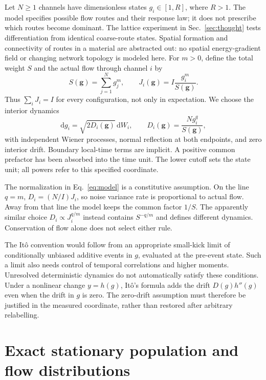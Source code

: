 \documentclass[11pt,a4paper]{article}
\newcommand{\dd}{\mathrm{d}}
\begin{document}
Let $N\geq1$ channels have dimensionless states $g_i\in[1,R]$, where $R>1$.
The model specifies possible flow routes and their response law; it does not
prescribe which routes become dominant. The lattice experiment in
Sec.~\ref{sec:thought} tests differentiation from identical coarse-route states.
Spatial formation and connectivity of routes in a material are abstracted out:
no spatial energy-gradient field or changing network topology is modeled here.
For $m>0$, define the total weight $S$ and the actual flow through channel $i$ by
\begin{equation}
 S(\mathbf g)=\sum_{j=1}^N g_j^m,\qquad
 J_i(\mathbf g)=I\frac{g_i^m}{S(\mathbf g)}.
 \label{eq:share}
\end{equation}
Thus $\sum_i J_i=I$ for every configuration, not only in expectation. We choose
the interior dynamics
\begin{equation}
 \dd g_i=\sqrt{2D_i(\mathbf g)}\,\dd W_i,\qquad
 D_i(\mathbf g)=\frac{N g_i^q}{S(\mathbf g)},
 \label{eq:model}
\end{equation}
with independent Wiener processes, normal reflection at both endpoints, and
zero interior drift. Boundary local-time terms are implicit. A positive common
prefactor has been absorbed into the time unit. The lower cutoff sets the state
unit; all powers refer to this specified coordinate.

The normalization in Eq.~\eqref{eq:model} is a constitutive assumption. On the
line $q=m$, $D_i=(N/I)J_i$, so noise variance rate is proportional to actual
flow. Away from that line the model keeps the common factor $1/S$. The apparently
similar choice $D_i\propto J_i^{q/m}$ instead contains $S^{-q/m}$ and defines
different dynamics. Conservation of flow alone does not select either rule.

The It\^o convention would follow from an appropriate small-kick limit of
conditionally unbiased additive events in $g$, evaluated at the pre-event
state. Such a limit also needs control of temporal correlations and higher
moments. Unresolved deterministic dynamics do not automatically satisfy these
conditions. Under a nonlinear change $y=h(g)$, It\^o's formula adds the drift
$D(g)h''(g)$ even when the drift in $g$ is zero. The zero-drift assumption must
therefore be justified in the measured coordinate, rather than restored after
arbitrary relabelling.

\section{Exact stationary population and flow distributions}
\end{document}
